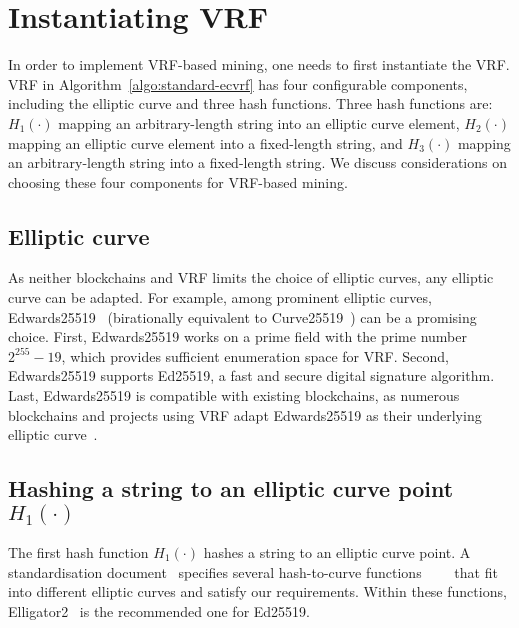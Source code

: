 \section{Instantiating VRF}
\label{sec:instantiation}

In order to implement VRF-based mining, one needs to first instantiate the VRF.
VRF in Algorithm~\ref{algo:standard-ecvrf} has four configurable components, including the elliptic curve and three hash functions.
Three hash functions are:
$H_{1}(\cdot)$ mapping an arbitrary-length string into an elliptic curve element,
$H_{2}(\cdot)$ mapping an elliptic curve element into a fixed-length string, and
$H_{3}(\cdot)$ mapping an arbitrary-length string into a fixed-length string.
We discuss considerations on choosing these four components for VRF-based mining.





\subsection{Elliptic curve}
As neither blockchains and VRF limits the choice of elliptic curves, any elliptic curve can be adapted.
For example, among prominent elliptic curves, Edwards25519~\cite{bernstein2012high} (birationally equivalent to Curve25519~\cite{bernstein2006curve25519}) can be a promising choice.
First, Edwards25519 works on a prime field with the prime number $2^{255} - 19$, which provides sufficient enumeration space for VRF.
Second, Edwards25519 supports Ed25519, a fast and secure digital signature algorithm.
Last, Edwards25519 is compatible with existing blockchains, as numerous blockchains and projects using VRF adapt Edwards25519 as their underlying elliptic curve~\cite{ethereum}\cite{tendermint}\cite{monero}.



\subsection{Hashing a string to an elliptic curve point $H_{1}(\cdot)$}
The first hash function $H_{1}(\cdot)$ hashes a string to an elliptic curve point.
A standardisation document~\cite{scott2019hashing} specifies several hash-to-curve functions~\cite{icart2009hash}~\cite{ulas2007rational}~\cite{brier2010efficient}~\cite{bernstein2013elligator} that fit into different elliptic curves and satisfy our requirements.
Within these functions, Elligator2~\cite{bernstein2013elligator} is the recommended one for Ed25519.




